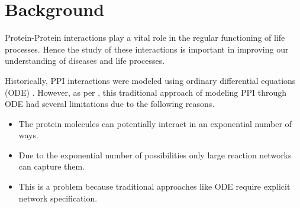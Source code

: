 \documentclass[msc,deptreport,ai]{infthesis}      %
\begin{document}







\chapter{Background}
Protein-Protein interactions play a vital role in the regular functioning of life processes. Hence the study of these interactions is important in improving our understanding of diseases and life processes.

Historically, PPI interactions were modeled using ordinary differential equations (ODE) \cite{ode}. However, as per \cite{rule-based-general}, this traditional approach of modeling PPI through ODE had several limitations due to the following reasons.

\begin{itemize}
	\item
	The protein molecules can potentially interact in an exponential number of ways. 
	\item
	Due to the exponential number of possibilities only large reaction networks can capture them.
	\item
	This is a problem because traditional approaches like ODE require explicit network specification.
\end{itemize}
\end{document}
